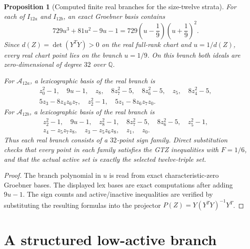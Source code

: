 \documentclass[11pt]{article}
\numberwithin{equation}{section}
\newtheorem{proposition}[theorem]{Proposition}
\theoremstyle{definition}
\newcommand{\cA}{\mathcal A}
\begin{document}
\begin{proposition}[Computed finite real branches for the size-twelve strata]
For each of $I_{12a}$ and $I_{12b}$, an exact Groebner basis contains
\[
  729u^3+81u^2-9u-1=729\left(u-\frac19\right)\left(u+\frac19\right)^2 .
\]
Since $d(Z)=\det(Y^TY)>0$ on the real full-rank chart and $u=1/d(Z)$, every
real chart point lies on the branch $u=1/9$.  On this branch both ideals are
zero-dimensional of degree $32$ over $\mathbb Q$.

For $\cA_{12a}$, a lexicographic basis of the real branch is
\[
\begin{gathered}
z_0^2-1,\quad 9u-1,\quad z_8,\quad 8z_7^2-5,\quad 8z_6^2-5,\quad z_5,\quad
8z_4^2-5,\\
5z_3-8z_4z_6z_7,\quad z_2^2-1,\quad 5z_1-8z_6z_7z_0 .
\end{gathered}
\]
For $\cA_{12b}$, a lexicographic basis of the real branch is
\[
\begin{gathered}
z_2^2-1,\quad 9u-1,\quad z_8^2-1,\quad 8z_7^2-5,\quad 8z_6^2-5,\quad
z_5^2-1,\\
z_4-z_5z_7z_8,\quad z_3-z_5z_6z_8,\quad z_1,\quad z_0 .
\end{gathered}
\]
Thus each real branch consists of a $32$-point sign family.  Direct substitution
checks that every point in each family satisfies the GTZ inequalities with
$F=1/6$, and that the actual active set is exactly the selected twelve-triple
set.
\end{proposition}

\begin{proof}
The branch polynomial in $u$ is read from exact characteristic-zero Groebner
bases.  The displayed lex bases are exact computations after adding $9u-1$.
The sign counts and active/inactive inequalities are verified by substituting
the resulting formulas into the projector $P(Z)=Y(Y^TY)^{-1}Y^T$.
\end{proof}

\section{A structured low-active branch}
\label{sec:structured-low-active}
\end{document}
